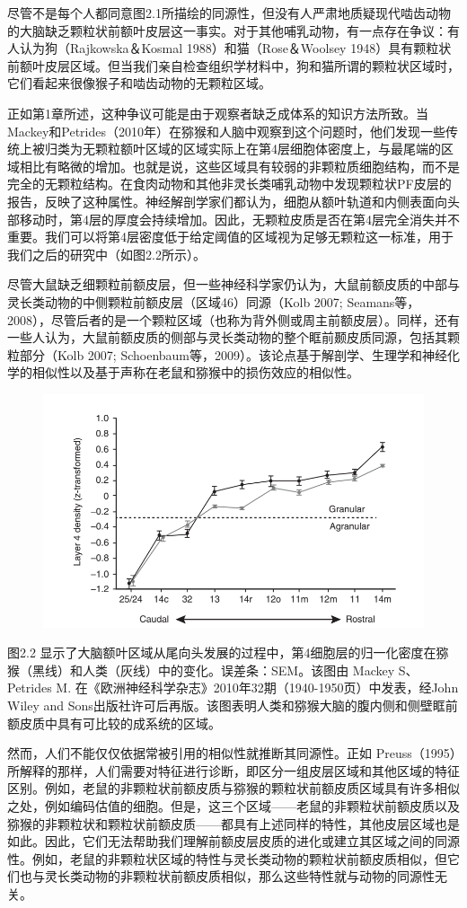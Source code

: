 尽管不是每个人都同意图2.1所描绘的同源性，但没有人严肃地质疑现代啮齿动物的大脑缺乏颗粒状前额叶皮层这一事实。对于其他哺乳动物，有一点存在争议：有人认为狗（Rajkowska＆Kosmal 1988）和猫（Rose＆Woolsey 1948）具有颗粒状前额叶皮层区域。但当我们亲自检查组织学材料中，狗和猫所谓的颗粒状区域时，它们看起来很像猴子和啮齿动物的无颗粒区域。

正如第1章所述，这种争议可能是由于观察者缺乏成体系的知识方法所致。当Mackey和Petrides（2010年）在猕猴和人脑中观察到这个问题时，他们发现一些传统上被归类为无颗粒额叶区域的区域实际上在第4层细胞体密度上，与最尾端的区域相比有略微的增加。也就是说，这些区域具有较弱的非颗粒质细胞结构，而不是完全的无颗粒结构。在食肉动物和其他非灵长类哺乳动物中发现颗粒状PF皮层的报告，反映了这种属性。神经解剖学家们都认为，细胞从额叶轨道和内侧表面向头部移动时，第4层的厚度会持续增加。因此，无颗粒皮质是否在第4层完全消失并不重要。我们可以将第4层密度低于给定阈值的区域视为足够无颗粒这一标准，用于我们之后的研究中（如图2.2所示）。

尽管大鼠缺乏细颗粒前额皮层，但一些神经科学家仍认为，大鼠前额皮质的中部与灵长类动物的中侧颗粒前额皮层（区域46）同源（Kolb 2007; Seamans等，2008），尽管后者的是一个颗粒区域（也称为背外侧或周主前额皮层）。同样，还有一些人认为，大鼠前额皮质的侧部与灵长类动物的整个眶前颞皮质同源，包括其颗粒部分（Kolb 2007; Schoenbaum等，2009）。该论点基于解剖学、生理学和神经化学的相似性以及基于声称在老鼠和猕猴中的损伤效应的相似性。

\begin{figure}
	\centering
	\includegraphics[width=0.7\linewidth]{2.png}
\end{figure}

图2.2 显示了大脑额叶区域从尾向头发展的过程中，第4细胞层的归一化密度在猕猴（黑线）和人类（灰线）中的变化。误差条：SEM。该图由 Mackey S、Petrides M. 在《欧洲神经科学杂志》2010年32期（1940-1950页）中发表，经John Wiley and Sons出版社许可后再版。该图表明人类和猕猴大脑的腹内侧和侧壁眶前额皮质中具有可比较的成系统的区域。

然而，人们不能仅仅依据常被引用的相似性就推断其同源性。正如 Preuss（1995）所解释的那样，人们需要对特征进行诊断，即区分一组皮层区域和其他区域的特征区别。例如，老鼠的非颗粒状前额皮质与猕猴的颗粒状前额皮质区域具有许多相似之处，例如编码估值的细胞。但是，这三个区域——老鼠的非颗粒状前额皮质以及猕猴的非颗粒状和颗粒状前额皮质——都具有上述同样的特性，其他皮层区域也是如此。因此，它们无法帮助我们理解前额皮层皮质的进化或建立其区域之间的同源性。例如，老鼠的非颗粒状区域的特性与灵长类动物的颗粒状前额皮质相似，但它们也与灵长类动物的非颗粒状前额皮质相似，那么这些特性就与动物的同源性无关。

